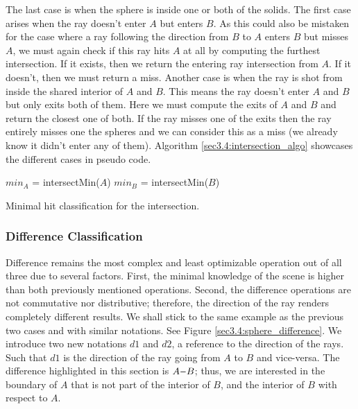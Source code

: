 \documentclass[a4paper,11pt,oneside]{article}
\newcommand{\minus}{\scalebox{0.9}[1.0]{$-$}} %
\begin{document}
The last case is when the sphere is inside one or both of the solids. The first case arises when the ray doesn't enter $A$ but enters $B$. As this could also be mistaken for the case where a ray following the direction from $B$ to $A$ enters $B$ but misses $A$, we must again check if this ray hits $A$ at all by computing the furthest intersection. If it exists, then we return the entering ray intersection from $A$. If it doesn't, then we must return a miss. Another case is when the ray is shot from inside the shared interior of $A$ and $B$. This means the ray doesn't enter $A$ and $B$ but only exits both of them. Here we must compute the exits of $A$ and $B$ and return the closest one of both. If the ray misses one of the exits then the ray entirely misses one the spheres and we can consider this as a miss (we already know it didn't enter any of them). Algorithm \ref{sec3.4:intersection_algo} showcases the different cases in pseudo code.

\begin{algorithm}
	\SetAlgoLined
	$min_A$ = intersectMin($A$)\;
	$min_B$ = intersectMin($B$)\;
	\caption{Minimal hit classification for the intersection.}
	\label{sec3.4:intersection_algo}
\end{algorithm} 

\subsubsection{Difference Classification}

Difference remains the most complex and least optimizable operation out of all three due to several factors. First, the minimal knowledge of the scene is higher than both previously mentioned operations. Second, the difference operations are not commutative nor distributive; therefore, the direction of the ray renders completely different results. We shall stick to the same example as the previous two cases and with similar notations. See Figure \ref{sec3.4:sphere_difference}. We introduce two new notations $d1$ and $d2$, a reference to the direction of the rays. Such that $d1$ is the direction of the ray going from $A$ to $B$ and vice-versa. The difference highlighted in this section is $A \minus B$; thus, we are interested in the boundary of $A$ that is not part of the interior of $B$, and the interior of $B$ with respect to $A$.
\end{document}
